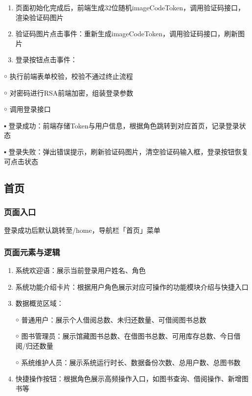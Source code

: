 \documentclass[12pt, a4paper]{article}
\begin{document}
\begin{enumerate}
\item  页面初始化完成后，前端生成32位随机imageCodeToken，调用验证码接口，渲染验证码图片

\item  验证码图片点击事件：重新生成imageCodeToken，调用验证码接口，刷新图片

\item  登录按钮点击事件：
\end{enumerate}

￮ 执行前端表单校验，校验不通过终止流程

￮ 对密码进行RSA前端加密，组装登录参数

￮ 调用登录接口

▪ 登录成功：前端存储Token与用户信息，根据角色跳转到对应首页，记录登录状态

▪ 登录失败：弹出错误提示，刷新验证码图片，清空验证码输入框，登录按钮恢复可点击状态

\subsection{首页}

\subsubsection{页面入口}

登录成功后默认跳转至/home，导航栏「首页」菜单

\subsubsection{页面元素与逻辑}

\begin{enumerate}
\item  系统欢迎语：展示当前登录用户姓名、角色

\item  系统功能介绍卡片：根据用户角色展示对应可操作的功能模块介绍与快捷入口

\item  数据概览区域：

￮ 普通用户：展示个人借阅总数、未归还数量、可借阅图书总数

￮ 图书管理员：展示馆藏图书总数、在借图书总数、可用库存总数、今日借阅/归还数量

￮ 系统维护人员：展示系统运行时长、数据备份次数、总用户数、总图书数

\item  快捷操作按钮：根据角色展示高频操作入口，如图书查询、借阅操作、新增图书等
\end{enumerate}
\end{document}
